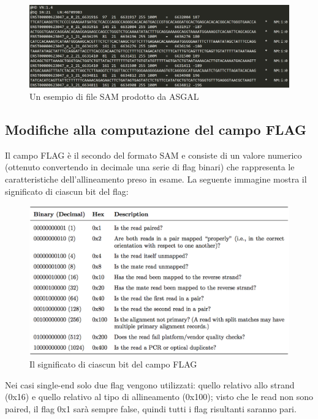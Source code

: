 \begin{figure}[h]
	\centering
	\includegraphics[width=\linewidth]{images/esempioSAM.png}
  \caption{Un esempio di file SAM prodotto da ASGAL}
  \label{fig:AlternativeSplicingTypes}
\end{figure}

\newpage

\subsection{Modifiche alla computazione del campo FLAG}
Il campo FLAG è il secondo del formato SAM e consiste di un valore numerico (ottenuto convertendo in decimale una serie di flag binari) che rappresenta le caratteristiche dell'allineamento preso in esame. La seguente immagine mostra il significato di ciascun bit del flag:

\begin{figure}[h]
	\centering
	\includegraphics[width=\linewidth]{images/samflag.png}
  \caption{Il significato di ciascun bit del campo FLAG }
  \label{fig:SAM Flags}
\end{figure}

Nei casi single-end solo due flag vengono utilizzati: quello relativo allo strand (0x16) e quello relativo al tipo di allineamento (0x100); visto che le read non sono paired, il flag 0x1 sarà sempre false, quindi tutti i flag risultanti saranno pari.

